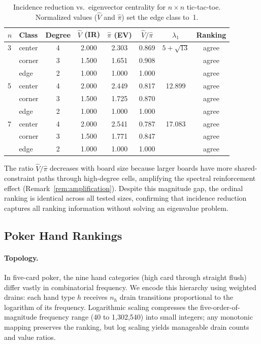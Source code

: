 \documentclass[11pt,a4paper]{article}
\begin{document}
\begin{table}[ht]
\centering
\caption{Incidence reduction vs.\ eigenvector centrality for $n \times n$ tic-tac-toe.  Normalized values ($\hat{V}$ and $\hat{\pi}$) set the edge class to~1.}
\label{tab:spectral}
\begin{tabular}{@{}llcccccc@{}}
\toprule
$n$ & Class & Degree & $\hat{V}$ (IR) & $\hat{\pi}$ (EV) & $\hat{V}/\hat{\pi}$ & $\lambda_1$ & Ranking \\
\midrule
3 & center & 4 & 2.000 & 2.303 & 0.869 & $5\!+\!\sqrt{13}$ & agree \\
  & corner & 3 & 1.500 & 1.651 & 0.908 & & agree \\
  & edge   & 2 & 1.000 & 1.000 & 1.000 & & agree \\
\midrule
5 & center & 4 & 2.000 & 2.449 & 0.817 & 12.899 & agree \\
  & corner & 3 & 1.500 & 1.725 & 0.870 & & agree \\
  & edge   & 2 & 1.000 & 1.000 & 1.000 & & agree \\
\midrule
7 & center & 4 & 2.000 & 2.541 & 0.787 & 17.083 & agree \\
  & corner & 3 & 1.500 & 1.771 & 0.847 & & agree \\
  & edge   & 2 & 1.000 & 1.000 & 1.000 & & agree \\
\bottomrule
\end{tabular}
\end{table}

The ratio $\hat{V}/\hat{\pi}$ decreases with board size because larger boards have more shared-constraint paths through high-degree cells, amplifying the spectral reinforcement effect (Remark~\ref{rem:amplification}).
Despite this magnitude gap, the ordinal ranking is identical across all tested sizes, confirming that incidence reduction captures all ranking information without solving an eigenvalue problem.

\subsection{Poker Hand Rankings}
\label{sec:poker}

\paragraph{Topology.}
In five-card poker, the nine hand categories (high card through straight flush) differ vastly in combinatorial frequency.
We encode this hierarchy using weighted drains: each hand type $h$ receives $n_h$ drain transitions proportional to the logarithm of its frequency.
Logarithmic scaling compresses the five-order-of-magnitude frequency range (40 to 1{,}302{,}540) into small integers; any monotonic mapping preserves the ranking, but log scaling yields manageable drain counts and value ratios.
\end{document}
